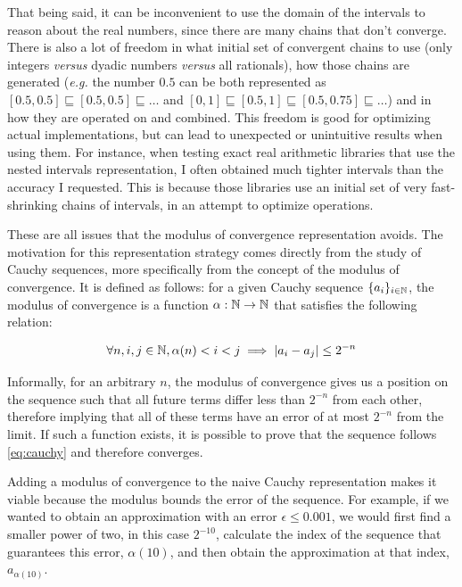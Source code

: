 That being said, it can be inconvenient to use the domain of the intervals to reason about the real numbers, since there are many chains that don't converge. There is also a lot of freedom in what initial set of convergent chains to use (only integers \textit{versus} dyadic numbers \textit{versus} all rationals), how those chains are generated (\textit{e.g.} the number $0.5$ can be both represented as $[0.5, 0.5] \sqsubseteq [0.5, 0.5] \sqsubseteq \dots$ and $[0,1] \sqsubseteq [0.5, 1] \sqsubseteq [0.5, 0.75] \sqsubseteq \dots$) and in how they are operated on and combined. This freedom is good for optimizing actual implementations, but can lead to unexpected or unintuitive results when using them. For instance, when testing exact real arithmetic libraries that use the nested intervals representation, I often obtained much tighter intervals than the accuracy I requested. This is because those libraries use an initial set of very fast-shrinking chains of intervals, in an attempt to optimize operations.

These are all issues that the modulus of convergence representation avoids. The motivation for this representation strategy comes directly from the study of Cauchy sequences, more specifically from the concept of the modulus of convergence. It is defined as follows: for a given Cauchy sequence $\{a_i\}_{i \in \mathbb{N}}$, the modulus of convergence is a function $\alpha:\mathbb{N} \rightarrow \mathbb{N}$ that satisfies the following relation:

\begin{equation}
\label{eq:modulus}
  \forall n,i,j \in \mathbb{N}, \alpha(n) < i < j \implies |a_i - a_j| \leq 2^{-n}
\end{equation}

Informally, for an arbitrary $n$, the modulus of convergence gives us a position on the sequence such that all future terms differ less than $2^{-n}$ from each other, therefore implying that all of these terms have an error of at most $2^{-n}$ from the limit. If such a function exists, it is possible to prove that the sequence follows \cref{eq:cauchy} and therefore converges.

Adding a modulus of convergence to the naive Cauchy representation makes it viable because the modulus bounds the error of the sequence. For example, if we wanted to obtain an approximation with an error $\epsilon \leq 0.001$, we would first find a smaller power of two, in this case $2^{-10}$, calculate the index of the sequence that guarantees this error, $\alpha(10)$, and then obtain the approximation at that index, $a_{\alpha(10)}$.

